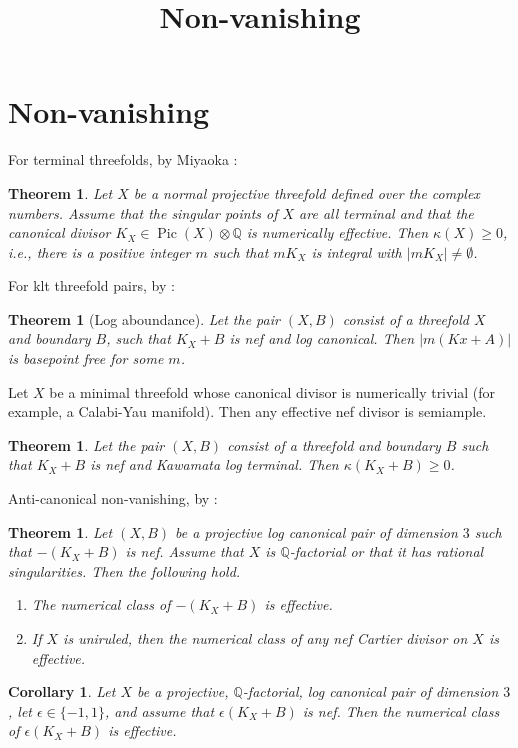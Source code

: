\documentclass{article}
\title{Non-vanishing}
\author{}
\newtheorem{theorem}[definition]{Theorem}
\newtheorem{corollary}[definition]{Corollary}
\begin{document}
\maketitle

\section{Non-vanishing}

For terminal threefolds, by Miyaoka \cite{Miy88}:
\begin{theorem}
  Let \(X\) be a normal projective threefold defined over the complex numbers. Assume that the singular points of \(X\) are all terminal and that the canonical divisor $ K_{X} \in \operatorname{Pic}(X)\otimes \mathbb{Q}   $ is numerically effective. Then $ \kappa (X) \geqslant 0 $, i.e., there is a positive integer \(m\) such that $mK_X$ is integral with $|mK_{X}| \neq \emptyset $.

\end{theorem}

For klt threefold pairs, by \cite{KMM94}:
\begin{theorem}[Log aboundance]
  Let the pair $ (X,B) $ consist of a threefold \(X\) and boundary \(B\), such that $ K_{X}+B $ is nef and log canonical. Then $  |m(Kx + A)| $ is basepoint free for some \(m\).
\end{theorem}

\begin{corollory}
  Let \(X\) be a minimal threefold whose canonical divisor is numerically trivial (for example, a Calabi-Yau manifold). Then any effective nef divisor is semiample.
\end{corollory}

\begin{theorem}
  Let the pair $ (X,B) $ consist of a threefold and boundary $ B $ such  that $ K_{X}+B $ is nef and Kawamata log terminal. Then  $ \kappa (K_{X}+B) \geqslant 0 $.
\end{theorem}

Anti-canonical non-vanishing, by \cite{LMPTX23}:

\begin{theorem}
  Let $ (X,B) $ be a projective log canonical pair of dimension \(3\) such that $ -(K_{X}+B) $ is nef. Assume that \(X\) is $\mathbb{Q} $-factorial or that it has rational singularities. Then the following hold.
  \begin{enumerate}
    \item
      The numerical class of $ -(K_{X}+B) $ is effective.
    \item If \(X\) is uniruled, then the numerical class of any nef Cartier divisor on \(X\) is effective.
  \end{enumerate}
\end{theorem}
\begin{corollary}
  Let $ X $ be a projective, $\mathbb{Q} $-factorial, log canonical pair of dimension \(3\), let $ \epsilon \in \{ -1,1 \} $, and assume that $ \epsilon(K_{X}+B) $ is nef. Then the numerical class of  $ \epsilon(K_{X}+B) $ is effective.
\end{corollary}
\end{document}
